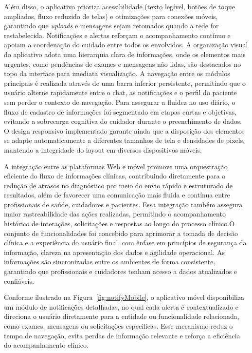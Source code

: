 \documentclass[conference,a4paper,10pt]{IEEETran}
\begin{document}
Além disso, o aplicativo prioriza acessibilidade (texto legível, botões de toque ampliados, fluxo reduzido de telas) e otimizações para conexões móveis, garantindo que \textit{uploads} e mensagens sejam retomados quando a rede for restabelecida. Notificações e alertas reforçam o acompanhamento contínuo e apoiam a coordenação do cuidado entre todos os envolvidos. A organização visual do aplicativo adota uma hierarquia clara de informações, onde os elementos mais urgentes, como pendências de exames e mensagens não lidas, são destacados no topo da interface para imediata visualização. A navegação entre os módulos principais é realizada através de uma barra inferior persistente, permitindo que o usuário alterne rapidamente entre o chat, as notificações e o perfil do paciente sem perder o contexto de navegação. Para assegurar a fluidez no uso diário, o fluxo de cadastro de informações foi segmentado em etapas curtas e objetivas, evitando a sobrecarga cognitiva do cuidador durante o preenchimento de dados. O design responsivo implementado garante ainda que a disposição dos elementos se adapte automaticamente a diferentes tamanhos de tela e densidades de pixels, mantendo a integridade do layout em diversos dispositivos móveis.

A integração entre as plataformas Web e móvel promove uma orquestração eficiente do fluxo de informações clínicas, contribuindo diretamente para a redução de atrasos no diagnóstico por meio do envio rápido e estruturado de resultados, além de favorecer uma comunicação mais fluida e contínua entre profissionais de saúde, cuidadores e pacientes. Essa integração também assegura maior rastreabilidade das ações realizadas, permitindo o acompanhamento histórico de interações, solicitações e respostas ao longo do processo clínico.O conjunto de funcionalidades foi concebido para aprimorar a tomada de decisão clínica e a experiência do usuário final, com ênfase em princípios de segurança da informação, clareza na apresentação dos dados e agilidade operacional. As informações são sincronizadas entre os ambientes de forma consistente, garantindo que profissionais e cuidadores tenham acesso a dados atualizados e confiáveis.

Conforme ilustrado na Figura~\ref{fig:notifyMobile}, o aplicativo móvel disponibiliza um módulo de notificações detalhadas, no qual cada alerta é contextualizado e direciona o usuário diretamente para a entidade ou funcionalidade relacionada, como exames, mensagens ou solicitações específicas. Esse mecanismo reduz o tempo de navegação, evita perdas de informação relevante e reforça a eficiência do acompanhamento clínico.
\end{document}
